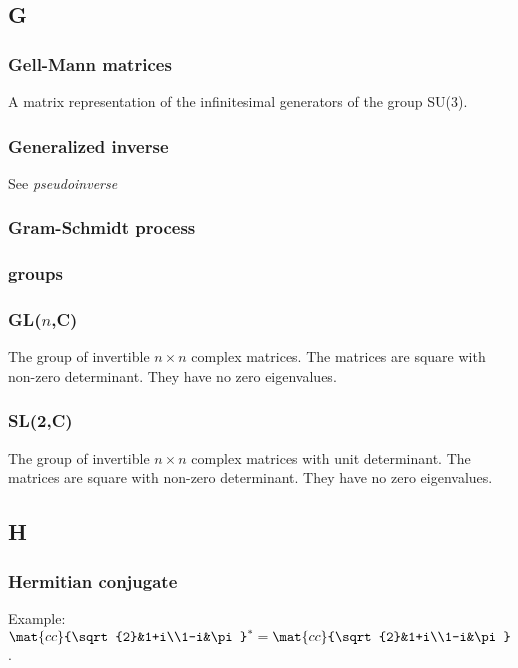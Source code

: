 \subsection*{G} 

\subsubsection*{Gell-Mann matrices}
A matrix representation of the infinitesimal generators of the group SU(3).

\subsubsection*{Generalized inverse}
See {\it pseudoinverse}

\subsubsection*{Gram-Schmidt process}

\subsubsection*{groups}

\subsubsection*{\textbf{GL}($n$,\textbf{C})}
The group of invertible $n \times n$ complex matrices. The matrices are square with non-zero determinant. They have no zero eigenvalues.

\subsubsection*{\textbf{SL}(2,\textbf{C})}
The group of invertible $n \times n$ complex matrices with unit determinant. The matrices are square with non-zero determinant. They have no zero eigenvalues.

\subsection*{H} 

\subsubsection*{Hermitian conjugate}
Example: $\mat{cc}{\sqrt{2}&1+i\\1-i&\pi}^{*}=\mat{cc}{\sqrt{2}&1+i\\1-i&\pi}$.

